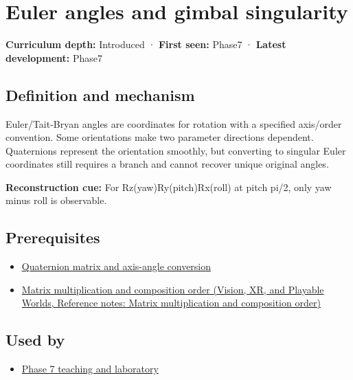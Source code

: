 \hypertarget{appendix-5f723fbd0593}{}\label{referencestart:appendix-5f723fbd0593}
\section{Euler angles and gimbal singularity}\label{appendix-5f723fbd0593-euler-angles-and-gimbal-singularity}

\textbf{Curriculum depth:} Introduced · \textbf{First seen:} Phase7 · \textbf{Latest development:} Phase7

\subsection{Definition and mechanism}\label{appendix-5f723fbd0593-definition-and-mechanism}

Euler/Tait-Bryan angles are coordinates for rotation with a specified axis/order convention. Some orientations make two parameter directions dependent. Quaternions represent the orientation smoothly, but converting to singular Euler coordinates still requires a branch and cannot recover unique original angles.

\textbf{Reconstruction cue:} For Rz(yaw)Ry(pitch)Rx(roll) at pitch pi/2, only yaw minus roll is observable.

\subsection{Prerequisites}\label{appendix-5f723fbd0593-prerequisites}

\begin{itemize}
\tightlist
\item
  \hyperref[appendix-26d8da71f6c4]{Quaternion matrix and axis-angle conversion}
\item
  \href{../07-Vision-XR-and-Playable-Worlds/main.pdf\#nameddest=appendix-ab31ef447dbf}{Matrix multiplication and composition order (Vision, XR, and Playable Worlds, Reference notes: Matrix multiplication and composition order)}
\end{itemize}

\subsection{Used by}\label{appendix-5f723fbd0593-used-by}

\begin{itemize}
\tightlist
\item
  \hyperref[01-foundations-i-ch018-keep-the-promises-visible-while-moving-between-representations]{Phase 7 teaching and laboratory}
\end{itemize}

